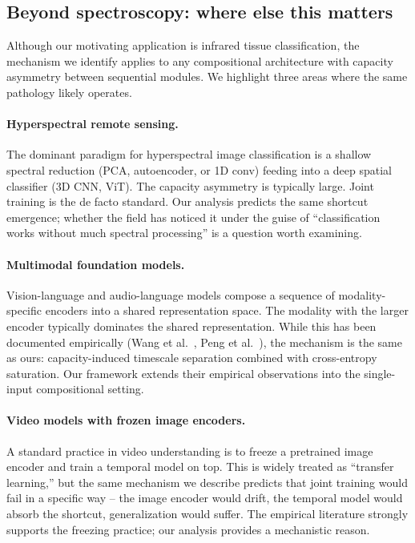 \subsection{Beyond spectroscopy: where else this matters}

Although our motivating application is infrared tissue classification,
the mechanism we identify applies to any compositional architecture
with capacity asymmetry between sequential modules. We highlight three
areas where the same pathology likely operates.

\paragraph{Hyperspectral remote sensing.}
The dominant paradigm for hyperspectral image classification is a
shallow spectral reduction (PCA, autoencoder, or 1D conv) feeding into
a deep spatial classifier (3D CNN, ViT). The capacity asymmetry is
typically large. Joint training is the de facto standard. Our analysis
predicts the same shortcut emergence; whether the field has noticed it
under the guise of ``classification works without much spectral
processing'' is a question worth examining.

\paragraph{Multimodal foundation models.}
Vision-language and audio-language models compose a sequence of
modality-specific encoders into a shared representation space. The
modality with the larger encoder typically dominates the shared
representation. While this has been documented empirically (Wang et
al.~\cite{wang2020what}, Peng et al.~\cite{peng2022balanced}), the
mechanism is the same as ours: capacity-induced timescale separation
combined with cross-entropy saturation. Our framework extends their
empirical observations into the single-input compositional setting.

\paragraph{Video models with frozen image encoders.}
A standard practice in video understanding is to freeze a pretrained
image encoder and train a temporal model on top. This is widely
treated as ``transfer learning,'' but the same mechanism we describe
predicts that joint training would fail in a specific way -- the
image encoder would drift, the temporal model would absorb the
shortcut, generalization would suffer. The empirical literature
strongly supports the freezing practice; our analysis provides a
mechanistic reason.

